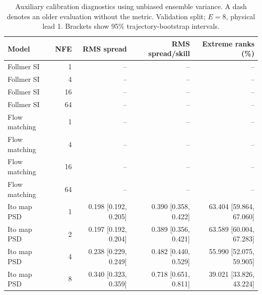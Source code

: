 \begin{table}[t]
\centering
\small
\setlength{\tabcolsep}{3pt}
\caption{Auxiliary calibration diagnostics using unbiased ensemble variance. A dash denotes an older evaluation without the metric. Validation split; $E=8$, physical lead 1. Brackets show 95\% trajectory-bootstrap intervals.}
\label{tab:map-rms-calibration}
\begin{tabular}{lrrrr}
\toprule
Model & NFE & RMS spread & RMS spread/skill & Extreme ranks (\%) \\
\midrule
Follmer SI & 1 & -- & -- & -- \\
Follmer SI & 4 & -- & -- & -- \\
Follmer SI & 16 & -- & -- & -- \\
Follmer SI & 64 & -- & -- & -- \\
\addlinespace
Flow matching & 1 & -- & -- & -- \\
Flow matching & 4 & -- & -- & -- \\
Flow matching & 16 & -- & -- & -- \\
Flow matching & 64 & -- & -- & -- \\
\addlinespace
Ito map PSD & 1 & 0.198 [0.192, 0.205] & 0.390 [0.358, 0.422] & 63.404 [59.864, 67.060] \\
Ito map PSD & 2 & 0.197 [0.192, 0.204] & 0.389 [0.356, 0.421] & 63.589 [60.004, 67.283] \\
Ito map PSD & 4 & 0.238 [0.229, 0.249] & 0.482 [0.440, 0.529] & 55.990 [52.075, 59.905] \\
Ito map PSD & 8 & 0.340 [0.323, 0.359] & 0.718 [0.651, 0.811] & 39.021 [33.826, 43.224] \\
\bottomrule
\end{tabular}
\end{table}
